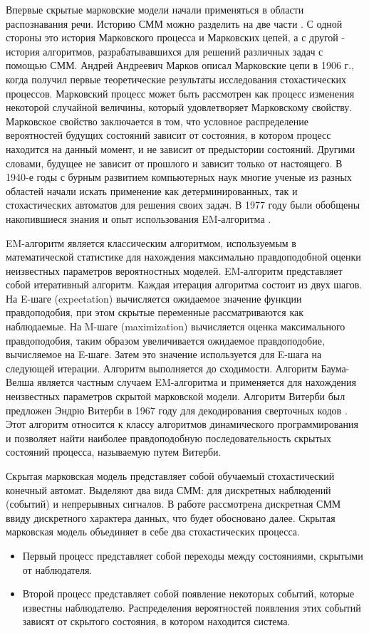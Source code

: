 Впервые скрытые марковские модели начали применяться в области распознавания речи. Историю СММ можно разделить на две части \cite{kouemou}. С одной стороны это история Марковского процесса и Марковских цепей, а с другой - история алгоритмов, разрабатывавшихся для решений различных задач с помощью СММ. Андрей Андреевич Марков описал Марковские цепи в 1906 г., когда получил первые теоретические результаты исследования стохастических процессов. Марковский процесс может быть рассмотрен как процесс изменения некоторой случайной величины, который удовлетворяет Марковскому свойству. Марковское свойство заключается в том, что условное распределение вероятностей будущих состояний зависит от состояния, в котором процесс находится на данный момент, и не зависит от предыстории состояний. Другими словами, будущее не зависит от прошлого и зависит только от настоящего. В 1940-е годы с бурным развитием компьютерных наук многие ученые из разных областей начали искать применение как детерминированных, так и стохастических автоматов для решения своих задач. В 1977 году были обобщены накопившиеся знания и опыт использования EM-алгоритма \cite{dempster1977maximum}. 

EM-алгоритм является классическим алгоритмом, используемым в математической статистике для нахождения максимально правдоподобной оценки неизвестных параметров вероятностных моделей. EM-алгоритм представляет собой итеративный алгоритм. Каждая итерация алгоритма состоит из двух шагов. На E-шаге (expectation) вычисляется ожидаемое значение функции правдоподобия, при этом скрытые переменные рассматриваются как наблюдаемые. На M-шаге (maximization) вычисляется оценка максимального правдоподобия, таким образом увеличивается ожидаемое правдоподобие, вычисляемое на E-шаге. Затем это значение используется для E-шага на следующей итерации. Алгоритм выполняется до сходимости. Алгоритм Баума-Велша является частным случаем EM-алгоритма и применяется для нахождения неизвестных параметров скрытой марковской модели. Алгоритм Витерби был предложен Эндрю Витерби в 1967 году для декодирования сверточных кодов \cite{viterbi1967error}. Этот алгоритм относится к классу алгоритмов динамического программирования и позволяет найти наиболее правдоподобную последовательность скрытых состояний процесса, называемую путем Витерби.

Скрытая марковская модель представляет собой обучаемый стохастический конечный автомат. Выделяют два вида СММ: для дискретных наблюдений (событий) и непрерывных сигналов. В работе рассмотрена дискретная СММ ввиду дискретного характера данных, что будет обосновано далее. Скрытая марковская модель объединяет в себе два стохастических процесса.
\begin{itemize}
\item
Первый процесс представляет собой переходы между состояниями, скрытыми от наблюдателя.
\item
Второй процесс представляет собой появление некоторых событий, которые известны наблюдателю. Распределения вероятностей появления этих событий зависят от скрытого состояния, в котором находится система.
\end{itemize}


